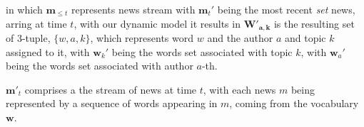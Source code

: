 in which $\mathbf{m}_{\le t}$ represents news stream with $\mathbf{m}_t'$ being the most recent \textit{set} news, arring at time $t$, with our dynamic model it results in  $\boldsymbol W'_{\boldsymbol a,\boldsymbol k}$ is the resulting set of 3-tuple, $\{w,a,k\}$, which represents word $w$ and the author $a$ and topic $k$ assigned to it, with $\mathbf{w}_k'$ being the words set associated with topic $k$,  with $\mathbf{w}_a'$ being the words set associated with author $a$-th.

$\mathbf{m}'_t$ comprises a the stream of news at time $t$, with each news $m$ being represented by a sequence of words appearing in $m$, coming from the vocabulary $\boldsymbol w$. %

